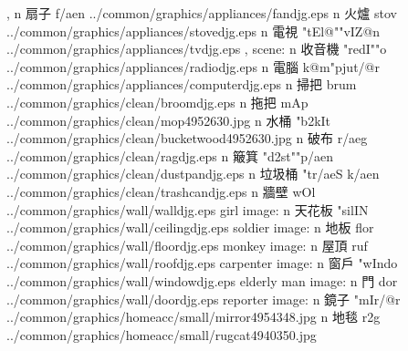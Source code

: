 \begin{tGe}{14}{, }
         {n} {扇子}    {}{f{/ae}n}            {../common/graphics/appliances/fandjg.eps}          {}%
       {n} {火爐}    {}{stov}              {../common/graphics/appliances/stovedjg.eps}        {}%
          {n} {電視}    {}{"tEl@""vIZ@n}      {../common/graphics/appliances/tvdjg.eps}           {, scene:}%
       {n} {收音機}  {}{"redI""o}          {../common/graphics/appliances/radiodjg.eps}        {}%
    {n} {電腦}    {}{k@m"pjut{/@r}}     {../common/graphics/appliances/computerdjg.eps}     {}%
       {n} {掃把}    {}{brum}              {../common/graphics/clean/broomdjg.eps}             {}
         {n} {拖把}    {}{mAp}               {../common/graphics/clean/mop4952630.jpg}        {}
      {n} {水桶}    {}{"b2kIt}            {../common/graphics/clean/bucketwood4952630.jpg} {}
         {n} {破布}    {}{r{/ae}g}            {../common/graphics/clean/ragdjg.eps}               {}
     {n} {簸箕}    {}{"d2st""p{/ae}n}     {../common/graphics/clean/dustpandjg.eps}           {}
   {n} {垃圾桶}  {}{"tr{/ae}S k{/ae}n}   {../common/graphics/clean/trashcandjg.eps}          {}
      {n} {牆壁}    {}{wOl}        {../common/graphics/wall/walldjg.eps}    {girl image:        }
   {n} {天花板}  {}{"silIN}     {../common/graphics/wall/ceilingdjg.eps} {soldier image:     }
     {n} {地板}    {}{flor}       {../common/graphics/wall/floordjg.eps}   {monkey image:      }
      {n} {屋頂}    {}{ruf}        {../common/graphics/wall/roofdjg.eps}    {carpenter image:   }
    {n} {窗戶}    {}{"wIndo}     {../common/graphics/wall/windowdjg.eps}  {elderly man image: }
      {n} {門}      {}{dor}        {../common/graphics/wall/doordjg.eps}    {reporter image:    }
    {n} {鏡子}  {}{"mIr{/@r}}         {../common/graphics/homeacc/small/mirror4954348.jpg}{}
       {n} {地毯}  {}{r2g}               {../common/graphics/homeacc/small/rugcat4940350.jpg}{}

\end{tGe}
